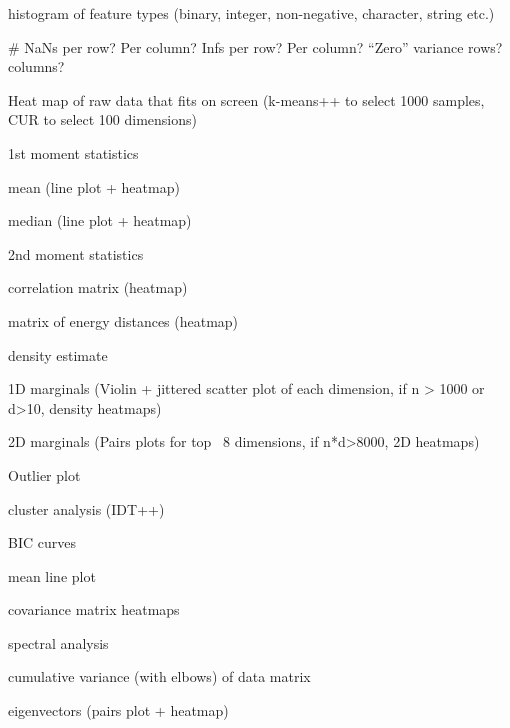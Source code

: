 \documentclass[simplex.tex]{subfiles}
\begin{document}
\begin{compactenum}
  \item histogram of feature types (binary, integer, non-negative, character, string etc.)
  \item \# NaNs per row? Per column? Infs per row? Per column? ``Zero'' variance rows? columns?
  \item Heat map of raw data that fits on screen (k-means++ to select 1000 samples, CUR to select 100 dimensions)
  \item 1st moment statistics
  \begin{compactenum}
    \item mean (line plot + heatmap)
    \item median (line plot + heatmap)
  \end{compactenum}
  \item 2nd moment statistics
  \begin{compactenum}
    \item correlation matrix (heatmap)
    \item matrix of energy distances (heatmap)
  \end{compactenum}
  \item density estimate
  \begin{compactenum}
    \item 1D marginals (Violin + jittered scatter plot of each dimension,  if n > 1000 or d>10, density heatmaps)
    \item 2D marginals (Pairs plots for top ~8 dimensions, if n*d>8000, 2D heatmaps)
  \end{compactenum}
  \item Outlier plot 
  \item cluster analysis (IDT++)
  \begin{compactenum}
    \item BIC curves
    \item mean line plot
    \item covariance matrix heatmaps
  \end{compactenum}
  \item spectral analysis
  \begin{compactenum}
    \item cumulative variance (with elbows) of data matrix
    \item eigenvectors (pairs plot + heatmap)
  \end{compactenum}
\end{compactenum}
\end{document}
